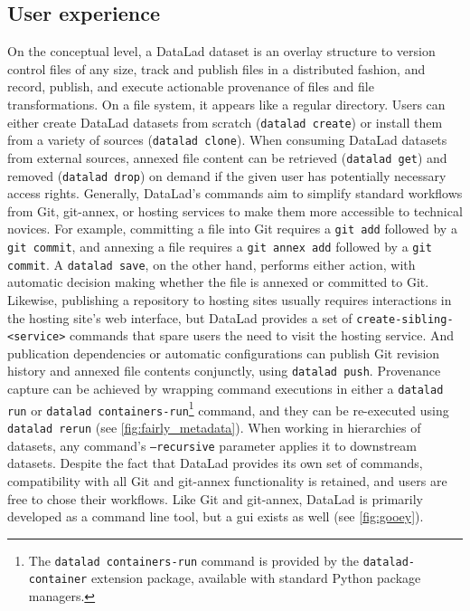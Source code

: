 {\subsection{User experience}

On the conceptual level, a DataLad dataset is an overlay structure to version control files of any size, track and publish files in a distributed fashion, and record, publish, and execute actionable provenance of files and file
transformations.
On a file system, it appears like a regular directory.
Users can either create DataLad datasets from scratch (\texttt{datalad create}) or install them from a variety of sources (\texttt{datalad clone}).
When consuming DataLad datasets from external sources, annexed file content can be retrieved (\texttt{datalad get}) and removed (\texttt{datalad drop}) on demand if the given user has potentially necessary access rights.
Generally, DataLad's commands aim to simplify standard workflows from Git, git-annex, or hosting services to make them more accessible to technical novices.
For example, committing a file into Git requires a \texttt{git add} followed by a \texttt{git commit}, and annexing a file requires a \texttt{git annex add} followed by a \texttt{git commit}.
A \texttt{datalad save}, on the other hand, performs either action, with automatic decision making whether the file is annexed or committed to Git.
Likewise, publishing a repository to hosting sites usually requires interactions in the hosting site's web interface, but DataLad provides a set of \texttt{create-sibling-<service>} commands that spare users the need to visit the hosting service.
And publication dependencies or automatic configurations can publish Git revision history and annexed file contents conjunctly, using \texttt{datalad push}.
Provenance capture can be achieved by wrapping command executions in either a \texttt{datalad run} or \texttt{datalad containers-run}\footnote{The \texttt{datalad containers-run} command is provided by the \texttt{datalad-container} extension package, available with standard Python package managers.} command, and they can be re-executed using \texttt{datalad rerun} (see \cref{fig:fairly_metadata}).
When working in hierarchies of datasets, any command's \texttt{--recursive} parameter applies it to downstream datasets.
Despite the fact that DataLad provides its own set of commands, compatibility with all Git and git-annex functionality is retained, and users are free to chose their workflows.
Like Git and git-annex, DataLad is primarily developed as a command line tool, but a \gls{gui} exists as well (see \cref{fig:gooey}).\\
}
